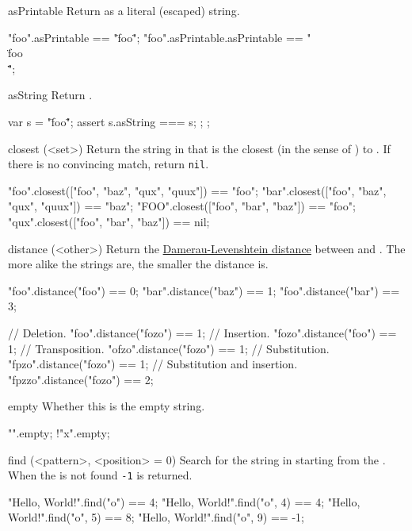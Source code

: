 \begin{urbiscriptapi}
\item[asPrintable]
  Return \this as a literal (escaped) string.
\begin{urbiassert}
"foo".asPrintable == "\"foo\"";
"foo".asPrintable.asPrintable == "\"\\\"foo\\\"\"";
\end{urbiassert}


\item[asString]
  Return \this.
\begin{urbiscript}
{
  var s = "\"foo\"";
  assert { s.asString === s; };
};
\end{urbiscript}


\item[closest](<set>)%
  Return the string in  that is the closest (in the sense of
  ) to \this.  If there is no convincing match,
  return \lstinline|nil|.
\begin{urbiassert}
"foo".closest(["foo", "baz", "qux", "quux"]) == "foo";
"bar".closest(["foo", "baz", "qux", "quux"]) == "baz";
"FOO".closest(["foo", "bar", "baz"])         == "foo";
"qux".closest(["foo", "bar", "baz"])         == nil;
\end{urbiassert}


\item[distance](<other>)%
  Return the
  \href{http://en.wikipedia.org/wiki/Damerau-Levenshtein_distance}
  {Damerau-Levenshtein distance} between \this and
  .  The more alike the strings are, the smaller the
  distance is.
\begin{urbiassert}
"foo".distance("foo") == 0;
"bar".distance("baz") == 1;
"foo".distance("bar") == 3;

// Deletion.
"foo".distance("fozo") == 1;
// Insertion.
"fozo".distance("foo") == 1;
// Transposition.
"ofzo".distance("fozo") == 1;
// Substitution.
"fpzo".distance("fozo") == 1;
// Substitution and insertion.
"fpzzo".distance("fozo") == 2;
\end{urbiassert}


\item[empty] Whether this is the empty string.
\begin{urbiassert}
  "".empty;
!"x".empty;
\end{urbiassert}


\item[find](<pattern>, <position> = 0)%
  Search for the  string in \this starting from the
  .  When the  is not found \lstinline|-1| is
  returned.
\begin{urbiassert}
"Hello, World!".find("o")    == 4;
"Hello, World!".find("o", 4) == 4;
"Hello, World!".find("o", 5) == 8;
"Hello, World!".find("o", 9) == -1;
\end{urbiassert}



\end{urbiscriptapi}
